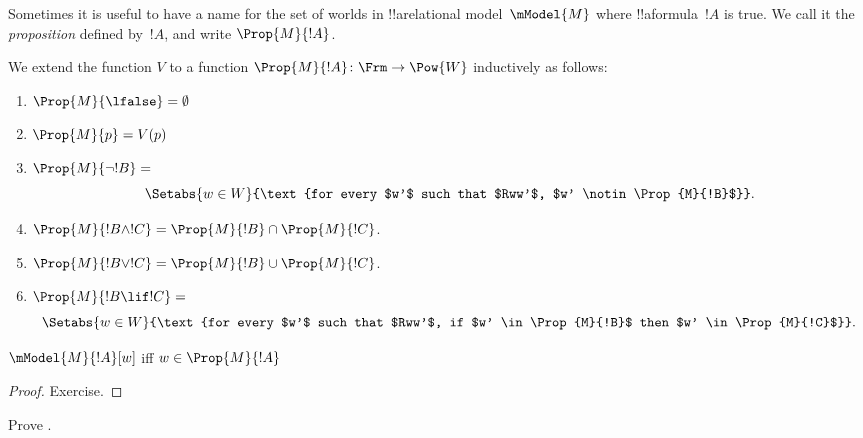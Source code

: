 \documentclass[../../../include/open-logic-section]{subfiles}
\begin{document}

Sometimes it is useful to have a name for the set of worlds in
!!a{relational model}~$\mModel{M}$ where !!a{formula}~$!A$ is true. We
call it the \emph{proposition} defined by~$!A$, and write
$\Prop{M}{!A}$. 

\begin{defn}
  We extend the function $V$ to a function $\Prop{M}{!A} \colon \Frm
  \to \Pow{W}$ inductively as follows:
  \begin{enumerate}
  \item $\Prop{M}{\lfalse} = \emptyset$
  \item $\Prop{M}{p} = V(p)$
  \item $\Prop{M}{\lnot !B} = {}$
    \[
      \Setabs{w \in W}{\text{for every $w'$ such that $Rww'$, $w'
          \notin \Prop{M}{!B}$}}.
    \]
  \item $\Prop{M}{!B \land !C} = \Prop{M}{!B} \cap \Prop{M}{!C}$.
  \item $\Prop{M}{!B \lor !C} = \Prop{M}{!B} \cup \Prop{M}{!C}$.
  \item $\Prop{M}{!B \lif !C} = {}$
    \[
      \Setabs{w \in W}{\text{for every $w'$ such that $Rww'$, if $w'
          \in \Prop{M}{!B}$ then $w' \in \Prop{M}{!C}$}}.
    \]
  \end{enumerate}
\end{defn}

\begin{prop}
  $\mModel{M}{!A}[w]$ iff $w \in \Prop{M}{!A}$
\end{prop}

\begin{proof}
  Exercise.
\end{proof}

\begin{prob}
  Prove .
\end{prob}
\end{document}
